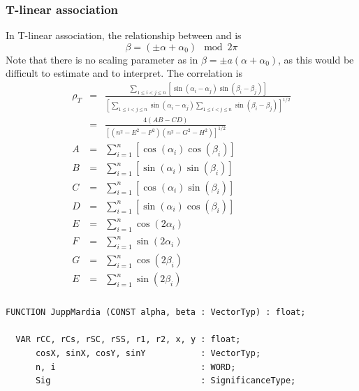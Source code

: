 \begin{refsection}
\subsubsection{T-linear association}

In T-linear association, the relationship between \skalar{\alpha} and \skalar{\beta} is
\begin{equation}
  \beta = (\pm\alpha + \alpha_0) \mod 2\pi
\end{equation}
Note that there is no scaling parameter as in \( \beta = \pm a (\alpha + \alpha_0) \), as this would be difficult to estimate and to interpret. The correlation is
\begin{eqnarray}
  \rho_T &=& \frac{\sum_{1 \leq i < j \leq n}[\sin(\alpha_i - \alpha_j) \sin(\beta_i - \beta_j)]}{[\sum_{1 \leq i < j \leq n}\sin(\alpha_i - \alpha_j) \sum_{1 \leq i < j \leq n}\sin(\beta_i - \beta_j)]^{1/2}} \\
         &=& \frac{4 (AB - CD)}{[(n^2 - E^2 -F^2) (n^2 - G^2 - H^2)]^{1/2}} \\
  A      &=& \sum_{i=1}^n[\cos(\alpha_i) \cos(\beta_i)] \\
  B      &=& \sum_{i=1}^n[\sin(\alpha_i) \sin(\beta_i)] \\
  C      &=& \sum_{i=1}^n[\cos(\alpha_i) \sin(\beta_i)] \\
  D      &=& \sum_{i=1}^n[\sin(\alpha_i) \cos(\beta_i)] \\
  E      &=& \sum_{i=1}^n \cos(2 \alpha_i) \\
  F      &=& \sum_{i=1}^n \sin(2 \alpha_i) \\
  G      &=& \sum_{i=1}^n \cos(2 \beta_i) \\
  E      &=& \sum_{i=1}^n \sin(2 \beta_i)
\end{eqnarray}

\subsubsection{ }

\begin{lstlisting}[caption=Jupp-Mardia]
  FUNCTION JuppMardia (CONST alpha, beta : VectorTyp) : float;

  VAR rCC, rCs, rSC, rSS, r1, r2, x, y : float;
      cosX, sinX, cosY, sinY           : VectorTyp;
      n, i                             : WORD;
      Sig                              : SignificanceType;


\end{lstlisting}
\end{refsection}
